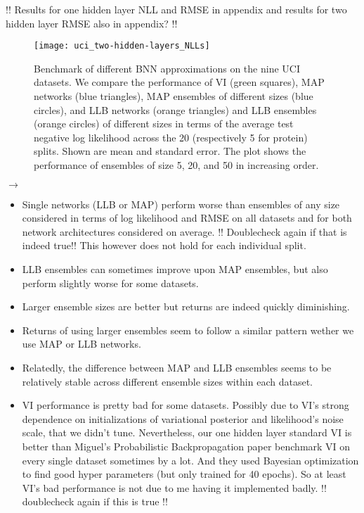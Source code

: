 \documentclass[../thesis.tex]{subfiles}
\begin{document}
!! Results for one hidden layer NLL and RMSE in appendix and results for two hidden layer RMSE also in appendix? !!
\begin{figure}
    \centering
    \texttt{[image: uci\_two-hidden-layers\_NLLs]} 
    \caption{Benchmark of different BNN approximations on the nine UCI datasets. We compare the performance of VI (green squares), MAP networks (blue triangles), MAP ensembles of different sizes (blue circles), and LLB networks (orange triangles) and LLB ensembles (orange circles) of different sizes in terms of the average test negative log likelihood across the 20 (respectively 5 for protein) splits. Shown are mean and standard error. The plot shows the performance of ensembles of size 5, 20, and 50 in increasing order.}
    \label{fig:uci-benchmark}
\end{figure}

$\rightarrow$
\begin{itemize}
    \item Single networks (LLB or MAP) perform worse than ensembles of any size considered in terms of log likelihood and RMSE on all datasets and for both network architectures considered on average. !! Doublecheck again if that is indeed true!! This however does not hold for each individual split.
    \item LLB ensembles can sometimes improve upon MAP ensembles, but also perform slightly worse for some datasets.
    \item Larger ensemble sizes are better but returns are indeed quickly diminishing.
    \item Returns of using larger ensembles seem to follow a similar pattern wether we use MAP or LLB networks.
    \item Relatedly, the difference between MAP and LLB ensembles seems to be relatively stable across different ensemble sizes within each dataset.
    \item VI performance is pretty bad for some datasets. Possibly due to VI's strong dependence on initializations of variational posterior and likelihood's noise scale, that we didn't tune. Nevertheless, our one hidden layer standard VI is better than Miguel’s Probabilistic Backpropagation paper benchmark VI on every single dataset sometimes by a lot. And they used Bayesian optimization to find good hyper parameters (but only trained for 40 epochs). So at least VI’s bad performance is not due to me having it implemented badly. !! doublecheck again if this is true !!
\end{itemize}
\end{document}
